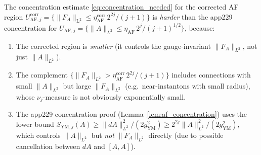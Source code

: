 \begin{remark}
\label{rem:concentration_hard}
The concentration estimate \eqref{eq:concentration_needed} for the
corrected AF region $U_{\mathrm{AF},j}^{\mathrm{corr}}=\{\|F_{A}\|_{
\mathrm{L^{2}}}\le\eta_{\mathrm{AF}}^{\mathrm{corr}}\,2^{2j}/(j+1)\}$
is \emph{harder} than the app229 concentration for
$U_{\mathrm{AF},j}=\{\|A\|_{L^{2}}\le\eta_{\mathrm{AF}}\,2^{j}/
(j+1)^{1/2}\}$, because:
\begin{enumerate}
\item The corrected region is \emph{smaller} (it controls the
gauge-invariant $\|F_{A}\|_{L^{2}}$, not just $\|A\|_{L^{2}}$).
\item The complement
$\{\|F_{A}\|_{L^{2}}>\eta_{\mathrm{AF}}^{\mathrm{corr}}\,2^{2j}/
(j+1)\}$ includes connections with small $\|A\|_{L^{2}}$ but
large $\|F_{A}\|_{L^{2}}$ (e.g.\ near-instantons with small
radius), whose $\nu_{j}$-measure is not obviously exponentially
small.
\item The app229 concentration proof (Lemma~\ref{lem:af_concentration})
uses the lower bound $S_{\mathrm{YM},j}(A)\ge\|dA\|_{L^{2}}^{2}/
(2g_{\mathrm{YM}}^{2})\ge 2^{2j}\|A\|_{L^{2}}^{2}/(2g_{\mathrm{YM}}^{
\mathrm{2}})$, which controls $\|A\|_{L^{2}}$ but \emph{not}
$\|F_{A}\|_{L^{2}}$ directly (due to possible cancellation between
$dA$ and $[A,A]$).
\end{enumerate}


\end{remark}
